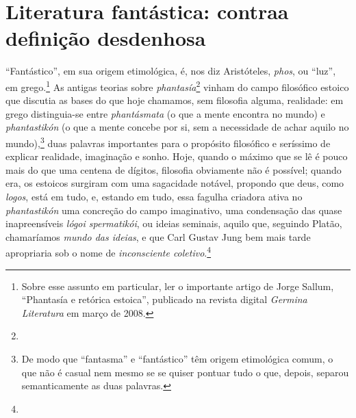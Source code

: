 \section{Literatura fantástica: contra\break a definição desdenhosa}

``Fantástico'', em sua origem etimológica, é, nos diz Aristóteles,
\emph{phos}, ou ``luz'', em grego.\footnote{Sobre esse assunto em
  particular, ler o importante artigo de Jorge Sallum, ``Phantasía e
  retórica estoica'', publicado na revista digital \emph{Germina
  Literatura} em março de 2008.} As antigas teorias sobre
\emph{phantasía}\footnote{} vinham do
campo filosófico estoico que discutia as bases do que hoje chamamos, sem
filosofia alguma, realidade: em grego distinguia-se entre
\emph{phantásmata} (o que a mente encontra no mundo) e
\emph{phantastikón} (o que a mente concebe por si, sem a necessidade de
achar aquilo no mundo),\footnote{De modo que ``fantasma'' e
  ``fantástico'' têm origem etimológica comum, o que não é casual nem
  mesmo se se quiser pontuar tudo o que, depois, separou semanticamente
  as duas palavras.} duas palavras importantes para o propósito
filosófico e seríssimo de explicar realidade, imaginação e sonho. Hoje,
quando o máximo que se lê é pouco mais do que uma centena de dígitos,
filosofia obviamente não é possível; quando era, os estoicos surgiram
com uma sagacidade notável, propondo que deus, como \emph{logos}, está
em tudo, e, estando em tudo, essa fagulha criadora ativa no
\emph{phantastikón} uma concreção do campo imaginativo, uma condensação
das quase inapreensíveis \emph{lógoi spermatikói}, ou ideias seminais,
aquilo que, seguindo Platão, chamaríamos \emph{mundo das ideias}, e
que Carl Gustav Jung bem mais tarde apropriaria sob o nome de
\emph{inconsciente coletivo}.\footnote{}


